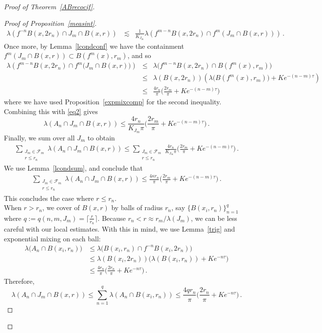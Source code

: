 \documentclass[11pt,reqno]{amsart}
\newcommand{\0}{\mathbf{0}}
\theoremstyle{remark}
\numberwithin{equation}{section}
\theoremstyle{remark}
\numberwithin{equation}{section}
\begin{document}
\begin{proof}[Proof of Theorem~\ref{ABrecocif}]
\begin{proof}[Proof of Proposition~\ref{measint}]
\begin{align}\label{eq2}
   \lambda\left(f^{-n}B(x,2r_n) \cap J_m \cap B(x,r)\right) \: & \lesssim & \frac{1}{K_{J_m}}  \lambda\left(f^{m-n}B(x,2r_n)  \cap f^m(J_m \cap B(x,r))\right) \, .  
\end{align}  
Once more, by Lemma~\ref{lcondconf} we have the containment $f^m (J_m \cap B(x,r)) \subset B(f^m(x),r_m)$, and so 
\begin{eqnarray*}
    \lambda\left(f^{m-n}B(x,2r_n)  \cap f^m\big(J_m \cap B(x,r)\big)\right) &\leq& \lambda\big(f^{m-n}B(x,2r_n)  \cap B(f^m(x),r_m)\big) 
    \\[2ex]& \leq & \lambda(B(x,2r_n))\left(\lambda\big(B(f^m(x),r_m)\big)+ Ke^{-(n-m)\tau} \right)
    \\[2ex] & \leq & \frac{4r_n}{\pi} \big(\frac{2r_m}{\pi} + Ke^{-(n-m)\tau} \big)
\end{eqnarray*}
where we have used Proposition~\ref{expmixcomp} for the second inequality. Combining this with \eqref{eq2} gives 
$$
\lambda(A_n \cap J_m \cap B(x,r)) \leq  \frac{4r_n}{K_{J_m}\pi} \big(\frac{2r_m}{\pi} + Ke^{-(n-m)\tau} \big) \, .
$$
Finally, we sum over all $J_m$ to obtain 
\begin{align}\label{sum0}
    \sum\limits_{\substack{J_m \in \mathcal{F}_m  \\ r \leq r_n}} \lambda(A_n \cap J_m \cap B(x,r)) \leq \sum\limits_{\substack{J_m \in \mathcal{F}_m  \\ r \leq r_n}} \frac{4r_n}{K_{J_m}\pi} \big(\frac{2r_m}{\pi} + Ke^{-(n-m)\tau} \big) \, .
\end{align}
 We use Lemma~\ref{lcondsum}, and conclude that
\begin{align}\label{sum1}
    \sum\limits_{\substack{J_m \in \mathcal{F}_m  \\ r \leq r_n}} \lambda(A_n \cap J_m \cap B(x,r)) \leq \frac{4\kappa r_n}{\pi}\big(\frac{2r_m}{\pi}+Ke^{-(n-m)\tau}\big) \, .
\end{align}
This concludes the case where $r \leq r_n$. 
\\
When $r > r_n$, we cover of $B(x,r)$ by balls of radius $r_n$, say $\{B(x_i,r_n)\}_{n=1}^{q}$ where $q:=q(n,m, J_m)=\lceil \frac{r}{r_n} \rceil $. Because $r_n<r \approx r_m/\lambda(J_m)$, we can be less careful with our local estimates. With this in mind, we use Lemma~\ref{trig} and exponential mixing on each ball: 
\begin{align*}
    \lambda\big(A_n \cap B(x_i,r_n) \big) & \leq  \lambda\big(B(x_i,r_n) \cap f^{-n}B(x_i,2r_n)\big) \\[1ex] & \leq \lambda(B(x_i,2r_n)) \big(\lambda(B(x_i,r_n))+ Ke^{-n\tau} \big) \\[1ex] & \leq \frac{4r_n}{\pi}\big(\frac{2r_n}{\pi}+ Ke^{-n\tau} \big) \, .
\end{align*}
Therefore, 
$$
\lambda(A_n \cap J_m \cap B(x,r)) \leq \sum\limits_{n=1}^{q}\lambda(A_n \cap B(x_i,r_n)) \leq \frac{4qr_n}{\pi}\big(\frac{2r_n}{\pi}+ Ke^{-n\tau} \big) \, .
$$


\end{proof}
\end{proof}
\end{document}

